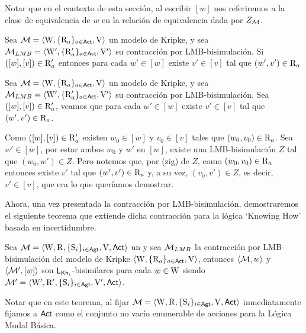 Notar que en el contexto de esta sección, al escribir $[w]$ nos referiremos a la clase de equivalencia de $w$ en la relación de 
equivalencia dada por $Z_{\mathcal{M}}$.

\begin{lema}\label{lema:LMB-R-lema}
    Sea $\mathcal{M} = \langle \mathrm{W},\{\mathrm{R}_a\}_{a\in{\rm \sf Act}},\mathrm{V} \rangle$ un modelo de Kripke, y sea $\mathcal{M}_{LMB} = \langle \mathrm{W}',\{\mathrm{R}_a'\}_{a\in{\rm \sf Act}},\mathrm{V}' \rangle$ su contracción por LMB-bisimulación.
    Si $([w],[v]) \in \mathrm{R}'_a$ entonces para cada $w' \in [w]$ existe $v' \in [v]$ tal que $(w',v') \in \mathrm{R}_a$
\end{lema}

\begin{demostracion}
    Sea $\mathcal{M} = \langle \mathrm{W},\{\mathrm{R}_a\}_{a\in{\rm \sf Act}},\mathrm{V} \rangle$ un modelo de Kripke, y sea $\mathcal{M}_{LMB} = \langle \mathrm{W}',\{\mathrm{R}_a'\}_{a\in{\rm \sf Act}},\mathrm{V}' \rangle$ su contracción por LMB-bisimulación. Sea $([w],[v]) \in \mathrm{R}'_a$, veamos que para cada $w' \in [w]$ existe $v' \in [v]$ tal que $(w',v') \in \mathrm{R}_a$.

    Como $([w],[v]) \in \mathrm{R}'_a$ existen $w_0 \in [w]$ y $v_0 \in [v]$ tales que $(w_0,v_0)\in \mathrm{R}_a$. Sea $w' \in [w]$, por estar ambos 
    $w_0$ y $w'$ en $[w]$, existe una LMB-bisimulación $Z$ tal que $(w_0,w') \in Z$. Pero notemos que, por (zig) de $Z$, como 
    $(w_0,v_0) \in \mathrm{R}_a$  entonces existe $v'$ tal que $(w',v') \in \mathrm{R}_a$ y, a su vez, 
    $(v_0,v') \in Z$, es decir, $v' \in [v]$, que era lo que queríamos demostrar.
\end{demostracion}

Ahora, una vez presentada la contracción por LMB-bisimulación, demostraremos el siguiente teorema que extiende dicha contracción para 
la lógica `Knowing How' basada en incertidumbre.

\begin{teorema}
    Sea $\mathcal{M}=\langle \mathrm{W},\mathrm{R},\{ \mathrm{S}_i \}_{i \in {\rm \sf Agt}},\mathrm{V},{\rm \sf Act} \rangle$ un \ults y sea $\mathcal{M}_{LMB}$ 
    la contracción por LMB-bisimulación del modelo de Kripke $\langle \mathrm{W},\{\mathrm{R}_a\}_{a\in{\rm \sf Act}},\mathrm{V} \rangle$, 
    entonces $\langle \mathcal{M},w \rangle$ y $\langle \mathcal{M}',[w] \rangle$ son $\mathsf{L}_{\mathsf{Kh}_i}$-bisimilares para cada $w \in \mathrm{W}$ 
    siendo $\mathcal{M}' = \langle \mathrm{W}',\mathrm{R}',\{ \mathrm{S}_i \}_{i \in {\rm \sf Agt}},\mathrm{V}',{\rm \sf Act} \rangle$.
\end{teorema}

Notar que en este teorema, al fijar $\mathcal{M}=\langle \mathrm{W},\mathrm{R},\{ \mathrm{S}_i \}_{i \in {\rm \sf Agt}},\mathrm{V},{\rm \sf Act} \rangle$ inmediatamente fijamos a ${\rm \sf Act}$ como el conjunto no vacío enumerable de acciones para la Lógica Modal Básica.

